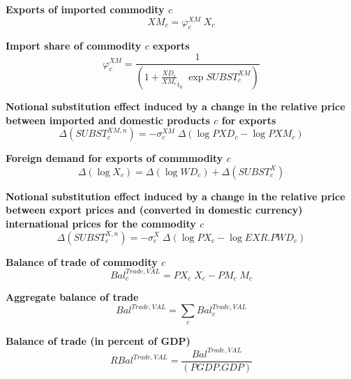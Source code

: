 \documentclass[12pt]{article}
\numberwithin{equation}{section}
\begin{document}
\noindent \textbf{Exports of imported commodity $c$} 
\begin{dmath}
XM_{c} = \varphi^{XM}_{c} \; X_{c}
\label{Trade_inter.mdlXM[c]}
\end{dmath}

\noindent \textbf{Import share of commodity $c$ exports} 
\begin{dmath}
\varphi^{XM}_{c} = \frac{1}{\left( 1 + \frac{XD_{c}}{XM_{c}}_{t_0} \; \operatorname{exp} SUBST^{XM}_{c} \right)}
\label{Trade_inter.mdlphi_XM[c]}
\end{dmath}

\noindent \textbf{Notional substitution effect induced by a change in the relative price between imported and domestic products $c$ for exports} 
\begin{dmath}
\varDelta \left(SUBST^{XM,n}_{c}\right) = -\sigma^{XM}_{c} \; \varDelta \left(\operatorname{log} PXD_{c} - \operatorname{log} PXM_{c}\right)
\label{Trade_inter.mdlSUBST_XM_n[c]}
\end{dmath}

\noindent \textbf{Foreign demand for exports of commmodity $c$} 
\begin{dmath}
\varDelta \left(\operatorname{log} X_{c}\right) = \varDelta \left(\operatorname{log} WD_{c}\right) + \varDelta \left(SUBST^{X}_{c}\right)
\label{Trade_inter.mdlX[c]}
\end{dmath}

\noindent \textbf{Notional substitution effect induced by a change in the relative price between export prices and (converted in domestic currency) international prices for the commodity $c$} 
\begin{dmath}
\varDelta \left(SUBST^{X,n}_{c}\right) = -\sigma^{X}_{c} \; \varDelta \left(\operatorname{log} PX_{c} - \operatorname{log} EXR . PWD_{c}\right)
\label{Trade_inter.mdlSUBST_X_n[c]}
\end{dmath}

\noindent \textbf{Balance of trade of commodity $c$} 
\begin{dmath}
Bal^{Trade,VAL}_{c} = PX_{c} \; X_{c} - PM_{c} \; M_{c}
\label{Trade_inter.mdlBal_Trae_VAL[c]}
\end{dmath}

\noindent \textbf{Aggregate balance of trade} 
\begin{dmath}
Bal^{Trade,VAL} = \sum_{c} Bal^{Trade,VAL}_{c}
\label{Trade_inter.mdlBal_Trae_VAL}
\end{dmath}

\noindent \textbf{Balance of trade (in percent of GDP)} 
\begin{dmath}
RBal^{Trade,VAL} = \frac{Bal^{Trade,VAL}}{\left( PGDP . GDP \right)}
\label{Trade_inter.mdlRBal_Trae_VAL}
\end{dmath}
\end{document}
